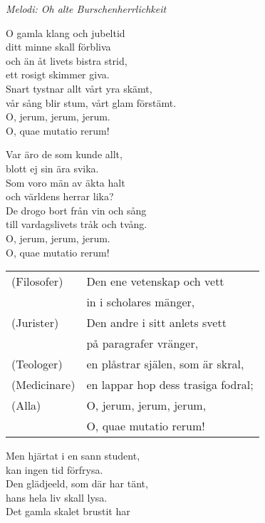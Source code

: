 {\footnotesize\textit{Melodi: Oh alte Burschenherrlichkeit}}\par
\vspace{10pt}
O gamla klang och jubeltid\\
ditt minne skall förbliva\\
och än åt livets bistra strid,\\
ett rosigt skimmer giva.\\
Snart tystnar allt vårt yra skämt,\\
vår sång blir stum, vårt glam förstämt.\\
O, jerum, jerum, jerum.\\
O, quae mutatio rerum!\par
\vspace{10pt}
Var äro de som kunde allt,\\
blott ej sin ära svika.\\
Som voro män av äkta halt\\
och världens herrar lika?\\
De drogo bort från vin och sång\\
till vardagslivets tråk och tvång.\\
O, jerum, jerum, jerum.\\
O, quae mutatio rerum!\\
\begin{leftborder}
\begin{tabular}{l l}
  (Filosofer)  & Den ene vetenskap och vett\\		
               & in i scholares mänger,\\
  (Jurister)   & Den andre i sitt anlets svett\\
               & på paragrafer vränger,\\
  (Teologer)   & en plåstrar själen, som är skral,\\
  (Medicinare) & en lappar hop dess trasiga fodral;\\
  (Alla)       & O, jerum, jerum, jerum,\\
               & O, quae mutatio rerum!
\end{tabular}
\end{leftborder}
\newpage
Men hjärtat i en sann student,\\
kan ingen tid förfrysa.\\
Den glädjeeld, som där har tänt,\\
hans hela liv skall lysa.\\
Det gamla skalet brustit har\\
